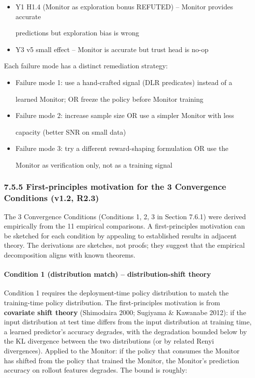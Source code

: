 \documentclass[
]{article}
\begin{document}
\begin{itemize}
\item
  Y1 H1.4 (Monitor as exploration bonus REFUTED) -- Monitor provides
  accurate

  predictions but exploration bias is wrong
\item
  Y3 v5 small effect -- Monitor is accurate but trust head is no-op
\end{itemize}

Each failure mode has a distinct remediation strategy:

\begin{itemize}
\item
  Failure mode 1: use a hand-crafted signal (DLR predicates) instead of
  a

  learned Monitor; OR freeze the policy before Monitor training
\item
  Failure mode 2: increase sample size OR use a simpler Monitor with
  less

  capacity (better SNR on small data)
\item
  Failure mode 3: try a different reward-shaping formulation OR use the

  Monitor as verification only, not as a training signal
\end{itemize}

\subsubsection{7.5.5 First-principles motivation for the 3 Convergence
Conditions (v1.2,
R2.3)}\label{first-principles-motivation-for-the-3-convergence-conditions-v1.2-r2.3}

The 3 Convergence Conditions (Conditions 1, 2, 3 in Section 7.6.1) were
derived empirically from the 11 empirical comparisons. A
first-principles motivation can be sketched for each condition by
appealing to established results in adjacent theory. The derivations are
sketches, not proofs; they suggest that the empirical decomposition
aligns with known theorems.

\paragraph{Condition 1 (distribution match) -- distribution-shift
theory}\label{condition-1-distribution-match-distribution-shift-theory}

Condition 1 requires the deployment-time policy distribution to match
the training-time policy distribution. The first-principles motivation
is from \textbf{covariate shift theory} (Shimodaira 2000; Sugiyama \&
Kawanabe 2012): if the input distribution at test time differs from the
input distribution at training time, a learned predictor's accuracy
degrades, with the degradation bounded below by the KL divergence
between the two distributions (or by related R\textquotesingle enyi
divergences). Applied to the Monitor: if the policy that consumes the
Monitor has shifted from the policy that trained the Monitor, the
Monitor's prediction accuracy on rollout features degrades. The bound is
roughly:
\end{document}
